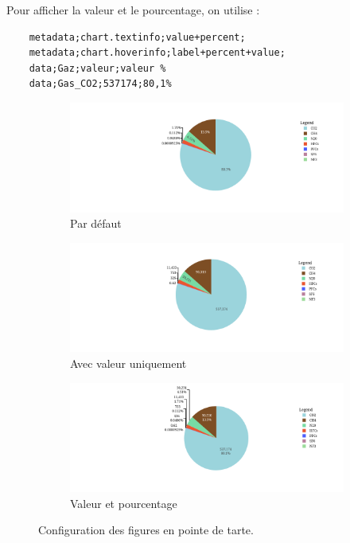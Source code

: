 \documentclass[11pt]{article}
\begin{document}
Pour afficher la valeur et le pourcentage, on utilise :
\begin{lstlisting}
    metadata;chart.textinfo;value+percent;
    metadata;chart.hoverinfo;label+percent+value;
    data;Gaz;valeur;valeur %
    data;Gas_CO2;537174;80,1%
\end{lstlisting}

\begin{figure}[h]
    \centering
    \begin{subfigure}{0.49\textwidth}
        \includegraphics[width=\textwidth]{assets/fig5.2.png}
        \caption{Par défaut}
        \label{fig:firstpie}
    \end{subfigure}
    \hfill
    \begin{subfigure}{0.49\textwidth}
        \includegraphics[width=\textwidth]{assets/fig5.2-value.png}
        \caption{Avec valeur uniquement}
        \label{fig:secondpie}
    \end{subfigure}
    \hfill
    \begin{subfigure}{0.5\textwidth}
        \includegraphics[width=\textwidth]{assets/fig5.2-valuePercent.png}
        \caption{Valeur et pourcentage}
        \label{fig:thirdpie}
    \end{subfigure}
            
    \caption{Configuration des figures en pointe de tarte.}
    \label{fig:piechart}
    \end{figure}
\end{document}
